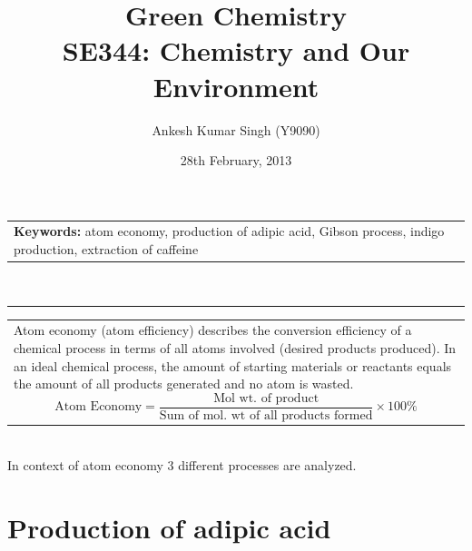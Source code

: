 \documentclass[pdftex,12pt,a4paper]{article}
\title{\vspace{-15pt}Green Chemistry\\ SE344: Chemistry and Our Environment}
\author{Ankesh Kumar Singh (Y9090)}
\date{28th February, 2013}
\begin{document}
\maketitle
\begin{tabular}{p{370pt}}
\textbf{Keywords: }atom economy, production of adipic acid, Gibson process, indigo production, extraction of caffeine
\end{tabular}
\vspace{10pt}\\
\hrule
\vspace{10pt}

\hspace{-15pt}\begin{tabular}{p{405pt}}
\rowcolor{Gray} \vspace{-5pt} 
Atom economy (atom efficiency) describes the conversion efficiency of a chemical process in terms of all atoms involved (desired products produced). In an ideal chemical process, the amount of starting materials or reactants equals the amount of all products generated and no atom is wasted.
$$\text{Atom Economy}=\frac{\text{Mol wt. of product}}{\text{Sum of mol. wt of all products formed}}\times100 \%$$
\end{tabular}
\vspace{10pt}\\
In context of atom economy 3 different processes are analyzed.
\section{Production of adipic acid}
\end{document}
